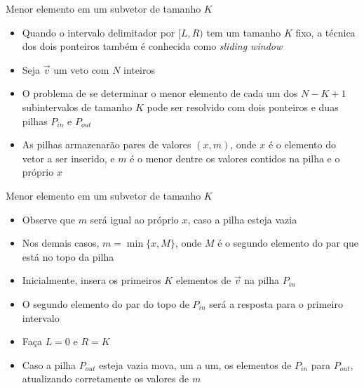 \begin{frame}[fragile]{Menor elemento em um subvetor de tamanho $K$}

    \begin{itemize}
        \item Quando o intervalo delimitador por $[L, R)$ tem um tamanho $K$ fixo, a técnica dos
            dois ponteiros também é conhecida como \textit{sliding window}

        \item Seja $\vec{v}$ um veto com $N$ inteiros

        \item O problema de se determinar o menor elemento de cada um dos $N - K + 1$ subintervalos
            de tamanho $K$ pode ser resolvido com dois ponteiros e duas pilhas $P_{in}$ e 
            $P_{out}$

        \item As pilhas armazenarão pares de valores $(x, m)$, onde $x$ é o elemento do vetor a
            ser inserido, e $m$ é o menor dentre os valores contidos na pilha e o próprio $x$
    \end{itemize}

\end{frame}

\begin{frame}[fragile]{Menor elemento em um subvetor de tamanho $K$}

    \begin{itemize}
        \item Observe que $m$ será igual ao próprio $x$, caso a pilha esteja vazia

        \item Nos demais casos, $m = \min\{ x, M \}$, onde $M$ é o segundo elemento do par que
            está no topo da pilha

        \item Inicialmente, insera os primeiros $K$ elementos de $\vec{v}$ na pilha $P_{in}$

        \item O segundo elemento do par do topo de $P_{in}$ será a resposta para o primeiro 
            intervalo

        \item Faça $L = 0$ e $R = K$

        \item Caso a pilha $P_{out}$ esteja vazia mova, um a um, os elementos de $P_{in}$ para
            $P_{out}$, atualizando corretamente os valores de $m$

    \end{itemize}

\end{frame}


